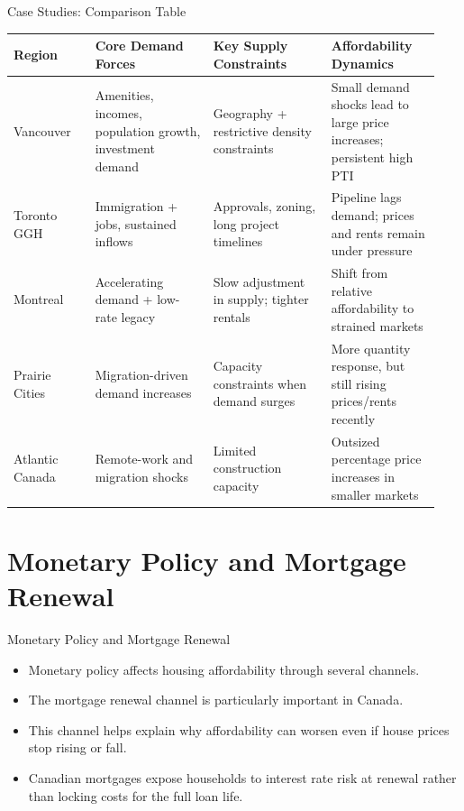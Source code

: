 \documentclass[aspectratio=169]{beamer}
\begin{document}
\begin{frame}{Case Studies: Comparison Table}
\transfade
\begin{center}
\scriptsize
\setlength{\tabcolsep}{3pt}
\renewcommand{\arraystretch}{1.2}
\begin{tabular}{p{0.18\linewidth} p{0.26\linewidth} p{0.26\linewidth} p{0.24\linewidth}}
\toprule
\textbf{Region} & \textbf{Core Demand Forces} & \textbf{Key Supply Constraints} & \textbf{Affordability Dynamics} \\
\midrule
Vancouver & Amenities, incomes, population growth, investment demand & Geography + restrictive density constraints & Small demand shocks lead to large price increases; persistent high PTI \\
\addlinespace[0.35em]
Toronto GGH & Immigration + jobs, sustained inflows & Approvals, zoning, long project timelines & Pipeline lags demand; prices and rents remain under pressure \\
\addlinespace[0.35em]
Montreal & Accelerating demand + low-rate legacy & Slow adjustment in supply; tighter rentals & Shift from relative affordability to strained markets \\
\addlinespace[0.35em]
Prairie Cities & Migration-driven demand increases & Capacity constraints when demand surges & More quantity response, but still rising prices/rents recently \\
\addlinespace[0.35em]
Atlantic Canada & Remote-work and migration shocks & Limited construction capacity & Outsized percentage price increases in smaller markets \\
\bottomrule
\end{tabular}
\end{center}
\end{frame}

\section{Monetary Policy and Mortgage Renewal}

\begin{frame}{Monetary Policy and Mortgage Renewal}
\transfade
\begin{itemize}
  \item Monetary policy affects housing affordability through several channels.
  \item The mortgage renewal channel is particularly important in Canada.
  \item This channel helps explain why affordability can worsen even if house prices stop rising or fall.
  \item Canadian mortgages expose households to interest rate risk at renewal rather than locking costs for the full loan life.
\end{itemize}
\end{frame}
\end{document}
